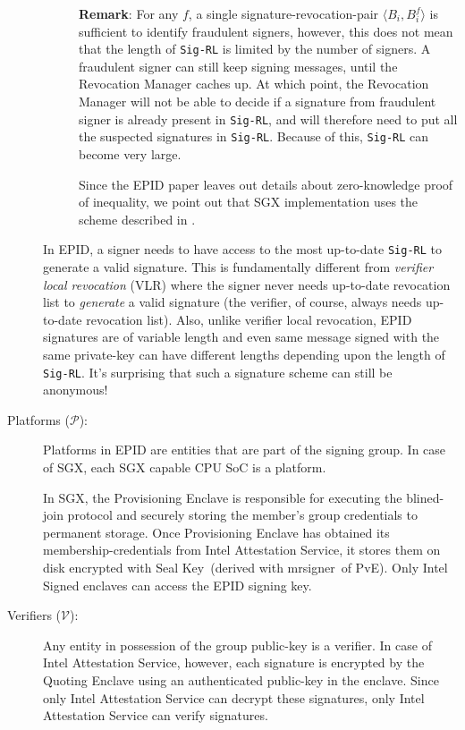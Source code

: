 \documentclass[letterpaper]{article}
\newcommand{\mrsigner}{\textsf{mrsigner}}
\newcommand{\pve}{\textsf{PvE}}
\newcommand{\sk}{\textsf{Seal Key}}
\begin{document}
\begin{description}
\begin{description}
        \textbf{Remark}: For any $f$, a single
        signature-revocation-pair $\langle B_i, B_i^f\rangle$ is
        sufficient to identify fraudulent signers, however, this does
        not mean that the length of \texttt{Sig-RL} is limited by the
        number of signers. A fraudulent signer can still keep signing
        messages, until the Revocation Manager caches up. At which
        point, the Revocation Manager will not be able to decide if a
        signature from fraudulent signer is already present in
        \texttt{Sig-RL}, and will therefore need to put all the
        suspected signatures in \texttt{Sig-RL}. Because of this,
        \texttt{Sig-RL} can become very large.

        Since the EPID paper leaves out details about zero-knowledge
        proof of inequality, we point out that SGX implementation
        \cite{epidsdk} uses the scheme described in
        \cite[\S6]{ShoupVFE}.
        
    \end{description}

    In EPID, a signer needs to have access to the most up-to-date
    \texttt{Sig-RL} to generate a valid signature. This is
    fundamentally different from \textit{verifier local revocation}
    (VLR) \cite{BonehVLR} where the signer never needs up-to-date
    revocation list to \textit{generate} a valid signature (the
    verifier, of course, always needs up-to-date revocation
    list). Also, unlike verifier local revocation, EPID signatures are
    of variable length and even same message signed with the same
    private-key can have different lengths depending upon the length
    of \texttt{Sig-RL}. It's surprising that such a signature scheme
    can still be anonymous!

    \item[Platforms ($\mathcal{P}$):] Platforms in EPID are entities
      that are part of the signing group. In case of SGX, each SGX
      capable CPU SoC is a platform.

      In SGX, the \textsf{Provisioning Enclave} is responsible for
      executing the blined-join protocol and securely storing the
      member's group credentials to permanent storage. Once
      \textsf{Provisioning Enclave} has obtained its
      membership-credentials from Intel Attestation Service, it stores
      them on disk encrypted with \sk\ (derived with \mrsigner\ of
      \pve). Only Intel Signed enclaves can access the EPID signing
      key.

    \item [Verifiers ($\mathcal{V}$):] Any entity in possession of the
      group public-key is a verifier. In case of Intel Attestation
      Service, however, each signature is encrypted by the
      \textsf{Quoting Enclave} using an authenticated public-key in
      the enclave. Since only Intel Attestation Service can decrypt
      these signatures, only Intel Attestation Service can verify
      signatures.


\end{description}
\end{document}
